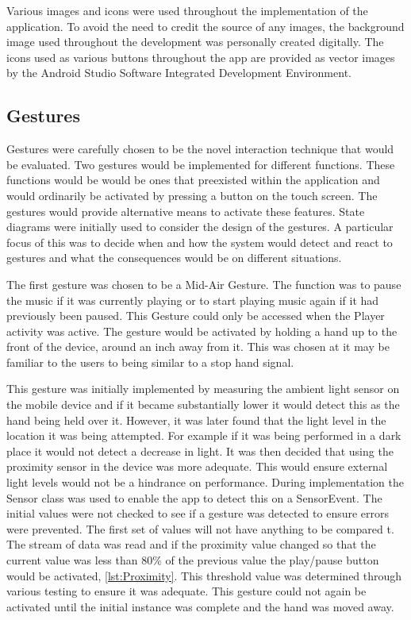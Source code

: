 \documentclass{l4proj}
\begin{document}
Various images and icons were used throughout the implementation of the application. To avoid the need to credit the source of any images, the background image used throughout the development was personally created digitally. The icons used as various buttons throughout the app are provided as vector images by the Android Studio Software Integrated Development Environment.


\subsection{Gestures}

Gestures were carefully chosen to be the novel interaction technique that would be evaluated. Two gestures would be implemented for different functions. These functions would be would be ones that preexisted within the application and would ordinarily be activated by pressing a button on the touch screen. The gestures would provide alternative means to activate these features. State diagrams were initially used to consider the design of the gestures. A particular focus of this was to decide when and how the system would detect and react to gestures and what the consequences would be on different situations. 

The first gesture was chosen to be a Mid-Air Gesture. The function was to pause the music if it was currently playing or to start playing music again if it had previously been paused. This Gesture could only be accessed when the Player activity was active. The gesture would be activated by holding a hand up to the front of the device, around an inch away from it. This was chosen at it may be familiar to the users to being similar to a stop hand signal. 

This gesture was initially implemented by measuring the ambient light sensor on the mobile device and if it became substantially lower it would detect this as the hand being held over it. However, it was later found that the light level in the location it was being attempted. For example if it was being performed in a dark place it would not detect a decrease in light. It was then decided that using the proximity sensor in the device was more adequate. This would ensure external light levels would not be a hindrance on performance. During implementation the Sensor class was used to enable the app to detect this on a SensorEvent. The initial values were not checked to see if a gesture was detected to ensure errors were prevented. The first set of values will not have anything to be compared t. The stream of data was read and if the proximity value changed so that the current value was less than 80\% of the previous value the play/pause button would be activated, \ref{lst:Proximity}. This threshold value was determined through various testing to ensure it was adequate. This gesture could not again be activated until the initial instance was complete and the hand was moved away.
\end{document}
